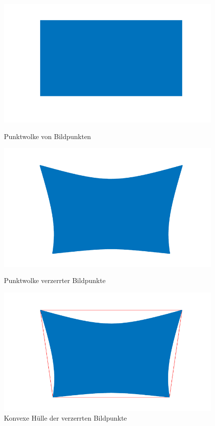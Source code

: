 \begin{figure}[h]
	\begin{minipage}{.3\textwidth}
		\centering
		\includegraphics[width=\textwidth]{img/pc.png}
		\caption{Punktwolke von Bildpunkten}
		\label{fig:pointcloud}
	\end{minipage}
	\begin{minipage}{.3\textwidth}
	\centering
	\includegraphics[width=\textwidth]{img/distortedpc.png}
	\caption{Punktwolke verzerrter Bildpunkte}
	\label{fig:distorted_pointcloud}
	\end{minipage}
	\begin{minipage}{.3\textwidth}
		\centering
		\includegraphics[width=\textwidth]{img/convexpc.png}
		\caption{Konvexe Hülle der verzerrten Bildpunkte}
		\label{fig:convex_hull}
	\end{minipage}
\end{figure}

